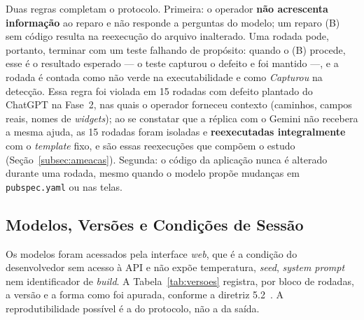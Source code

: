 \documentclass[12pt]{article}
\begin{document}
Duas regras completam o protocolo. Primeira: o operador \textbf{não
acrescenta informação} ao reparo e não responde a perguntas do modelo; um
reparo (B) sem código resulta na reexecução do arquivo inalterado. Uma rodada
pode, portanto, terminar com um teste falhando de propósito: quando o (B)
procede, esse é o resultado esperado --- o teste capturou o defeito e foi
mantido ---, e a rodada é contada como não verde na executabilidade e como
\emph{Capturou} na detecção. Essa regra
foi violada em 15 rodadas com defeito plantado do ChatGPT na Fase~2, nas
quais o operador forneceu contexto (caminhos, campos reais, nomes de
\textit{widgets}); ao se constatar que a réplica com o Gemini não recebera a
mesma ajuda, as 15 rodadas foram isoladas e \textbf{reexecutadas
integralmente} com o \textit{template} fixo, e são essas reexecuções que
compõem o estudo (Seção~\ref{subsec:ameacas}). Segunda: o código da
aplicação nunca é alterado durante uma rodada, mesmo quando o modelo propõe
mudanças em \texttt{pubspec.yaml} ou nas telas.

\subsection{Modelos, Versões e Condições de Sessão}
\label{subsec:sessao}

Os modelos foram acessados pela interface \textit{web}, que é a condição do
desenvolvedor sem acesso à API e não expõe temperatura, \textit{seed},
\textit{system prompt} nem identificador de \textit{build}. A
Tabela~\ref{tab:versoes} registra, por bloco de rodadas, a versão e a forma
como foi apurada, conforme a diretriz 5.2~\cite{baltes2026guidelines}. A
reprodutibilidade possível é a do protocolo, não a da saída.
\end{document}
